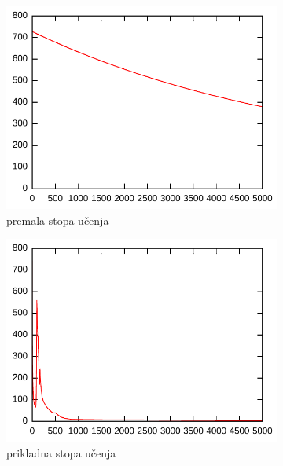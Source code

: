 \documentclass{article}
\begin{document}
\begin{figure}[h]
    \centering
    \begin{subfigure}[b]{0.32\textwidth}
        \centering
        \includegraphics[width=\textwidth]{img/eta-batch-low.pdf}
        \caption{premala stopa učenja}
    \end{subfigure}
    \hfill
    \begin{subfigure}[b]{0.32\textwidth}
        \centering
        \includegraphics[width=\textwidth]{img/eta-batch-middle.pdf}
        \caption{prikladna stopa učenja}
    \end{subfigure}
    \hfill
    \begin{subfigure}[b]{0.32\textwidth}
        \centering

\end{subfigure}
\end{figure}
\end{document}
